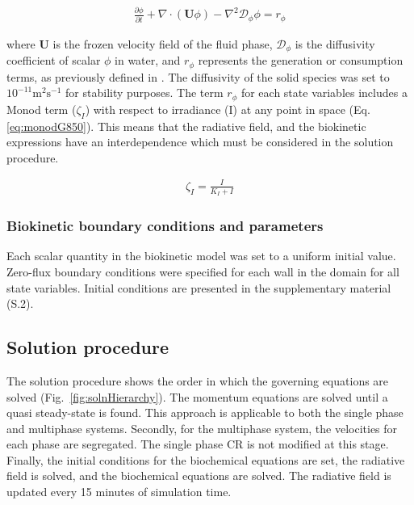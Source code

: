\begin{align}
\frac{\partial \phi}{\partial t} + \nabla \cdot \left( \mathbf{U}\phi \right) - \nabla^2\mathcal{D}_\phi \phi = r_{\phi}
\end{align}

\noindent where $\mathbf{U}$ is the frozen velocity field of the fluid phase, $\mathcal{D}_{\phi}$ is the diffusivity coefficient of scalar $\phi$ in water, and $r_{\phi}$ represents the generation or consumption terms, as previously defined in \cite{puyol2017}. The diffusivity of the solid species was set to $10^{-11} \mathrm{m^2 s^{-1}}$ for stability purposes.
\skippingparagraph
The term $r_\phi$ for each state variables includes a Monod term ($\zeta_I$) with respect to irradiance (I) at any point in space (Eq. \eqref{eq:monodG850}). This means that the radiative field, and the biokinetic expressions have an interdependence which must be considered in the solution procedure.

\begin{align}
\label{eq:monodG850}
\zeta_I = \frac{I}{K_I + I}
\end{align}

\subsubsection{Biokinetic boundary conditions and parameters}
Each scalar quantity in the biokinetic model was set to a uniform initial value. Zero-flux boundary conditions were specified for each wall in the domain for all state variables. Initial conditions are presented in the supplementary material (S.2).

\subsection{Solution procedure}
\label{ssec:soln}
The solution procedure shows the order in which the governing equations are solved (Fig.\ \ref{fig:solnHierarchy}). The momentum equations are solved until a quasi steady-state is found. This approach is applicable to both the single phase and multiphase systems. Secondly, for the multiphase system, the velocities for each phase are segregated. The single phase CR is not modified at this stage. Finally, the initial conditions for the biochemical equations are set, the radiative field is solved, and the biochemical equations are solved. The radiative field is updated every 15 minutes of simulation time.

